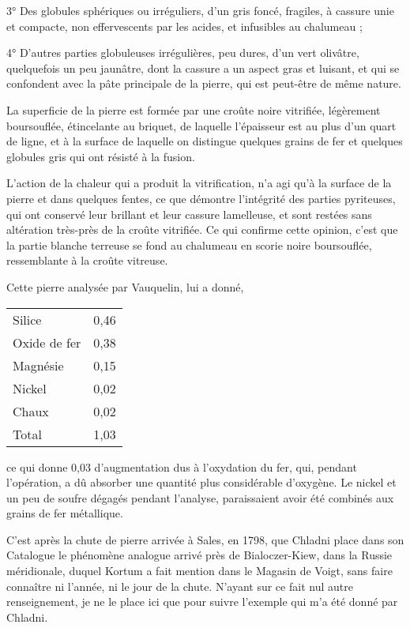 \documentclass[a4paper, 12pt, oneside, french]{article}
\begin{document}
3° Des globules sphériques ou irréguliers, d'un gris foncé, fragiles, à cassure unie et compacte, non effervescents par les acides, et infusibles au chalumeau ;

4° D'autres parties globuleuses irrégulières, peu dures, d'un vert olivâtre, quelquefois un peu jaunâtre, dont la cassure a un aspect gras et luisant, et qui se confondent avec la pâte principale de la pierre, qui est peut-être de même nature.

La superficie de la pierre est formée par une croûte noire vitrifiée, légèrement boursouflée, étincelante au briquet, de laquelle l'épaisseur est au plus d'un quart de ligne, et à la surface de laquelle on distingue quelques grains de fer et quelques globules gris qui ont résisté à la fusion.

L'action de la chaleur qui a produit la vitrification, n'a agi qu'à la surface de la pierre et dans quelques fentes, ce que démontre l'intégrité des parties pyriteuses, qui ont conservé leur brillant et leur cassure lamelleuse, et sont restées sans altération très-près de la croûte vitrifiée. Ce qui confirme cette opinion, c'est que la partie blanche terreuse se fond au chalumeau en scorie noire boursouflée, ressemblante à la croûte vitreuse.

Cette pierre analysée par Vauquelin, lui a donné,
\begin{table}[H]
    \centering
    \begin{tabular}{l r}
        Silice & 0,46 \\
        Oxide de fer & 0,38 \\
        Magnésie & 0,15 \\
        Nickel & 0,02 \\
        Chaux & 0,02 \\ \hline
        Total & 1,03 \\
    \end{tabular}
\end{table}
ce qui donne 0,03 d'augmentation dus à l'oxydation du fer, qui, pendant l'opération, a dû absorber une quantité plus considérable d'oxygène. Le nickel et un peu de soufre dégagés pendant l'analyse, paraissaient avoir été combinés aux grains de fer métallique.

C'est après la chute de pierre arrivée à Sales, en 1798, que Chladni place dans son Catalogue le phénomène analogue arrivé près de Bialoczer-Kiew, dans la Russie méridionale, duquel Kortum a fait mention dans le Magasin de Voigt, sans faire connaître ni l'année, ni le jour de la chute. N'ayant sur ce fait nul autre renseignement, je ne le place ici que pour suivre l'exemple qui m'a été donné par Chladni.
\end{document}
